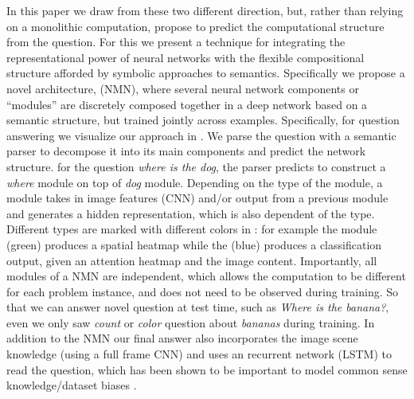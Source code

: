 In this paper we draw from these two different direction, but, rather than relying on a monolithic computation, propose to predict the computational structure from the question. 
 For this we present a technique for integrating the
representational power of neural networks with the flexible compositional
structure afforded by symbolic approaches to semantics. 
Specifically we propose a novel architecture, \nmn (NMN), where several neural network components or ``modules'' are discretely composed together in a deep network based on a semantic structure, but trained jointly across examples.  Specifically, for question answering we visualize our approach in . We parse the question with a semantic parser to decompose it into its main components and predict the network structure. \Eg for the question \emph{where is the dog}, the parser predicts to construct a \emph{where} module on top of \emph{dog} module. 
Depending on the type of the module, a module takes in image features (CNN) and/or output from a previous module and generates a hidden representation, which is also dependent of the type. Different types are marked with different colors in : 
for example the  module (green) produces a spatial heatmap while the  (blue) produces a classification output, given an attention heatmap and the image content.
Importantly, all modules of a NMN are independent, which allows the computation to be different for each problem instance, and does not need to be observed during training. So that we can answer novel question at test time, such as \emph{Where is the banana?}, even we only saw \emph{count} or \emph{color} question about \emph{bananas} during training.
In addition to the NMN our final answer also incorporates the image scene knowledge (using a full frame CNN) and uses an  recurrent network (LSTM) to read the question, which has been shown to be important to model common sense knowledge/dataset biases \cite{malinowski15iccv}.



